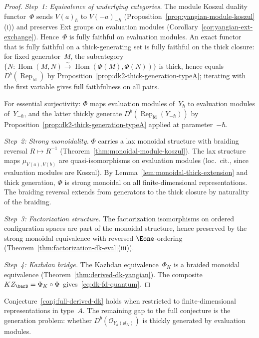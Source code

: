 \begin{proof}
\emph{Step~1: Equivalence of underlying categories.}
The module Koszul duality functor~$\Phi$ sends $V(a)_\hbar$ to
$V(-a)_{-\hbar}$ (Proposition~\ref{prop:yangian-module-koszul}(i))
and preserves Ext groups on evaluation modules
(Corollary~\ref{cor:yangian-ext-exchange}).  Hence~$\Phi$ is fully
faithful on evaluation modules.  An exact functor that is fully
faithful on a thick-generating set is fully faithful on the thick
closure: for fixed generator~$M$, the subcategory
$\{N : \operatorname{Hom}(M,N) \xrightarrow{\sim}
\operatorname{Hom}(\Phi(M), \Phi(N))\}$
is thick, hence equals $D^b(\operatorname{Rep}_{\mathrm{fd}})$ by
Proposition~\ref{prop:dk2-thick-generation-typeA}; iterating with
the first variable gives full faithfulness on all pairs.

For essential surjectivity: $\Phi$ maps evaluation modules
of~$Y_\hbar$ to evaluation modules of~$Y_{-\hbar}$, and the latter
thickly generate
$D^b(\operatorname{Rep}_{\mathrm{fd}}(Y_{-\hbar}))$ by
Proposition~\ref{prop:dk2-thick-generation-typeA} applied at
parameter~$-\hbar$.

\emph{Step~2: Strong monoidality.}
$\Phi$ carries a lax monoidal structure with braiding reversal
$R \mapsto R^{-1}$
(Theorem~\ref{thm:monoidal-module-koszul}).  The lax structure maps
$\mu_{V(a), V(b)}$ are quasi-isomorphisms on evaluation modules
(loc.~cit., since evaluation modules are Koszul).  By
Lemma~\ref{lem:monoidal-thick-extension} and thick generation,
$\Phi$ is strong monoidal on all finite-dimensional representations.
The braiding reversal extends from generators to the thick closure
by naturality of the braiding.

\emph{Step~3: Factorization structure.}
The factorization isomorphisms on ordered configuration spaces are
part of the monoidal structure, hence preserved by the strong monoidal
equivalence with reversed $\Eone$-ordering
(Theorem~\ref{thm:factorization-dk-eval}(iii)).

\emph{Step~4: Kazhdan bridge.}
The Kazhdan equivalence~$\Phi_K$ is a braided monoidal equivalence
(Theorem~\ref{thm:derived-dk-yangian}).  The composite
$KZ_{\barB} = \Phi_K \circ \Phi$ gives~\eqref{eq:dk-fd-quantum}.
\end{proof}

\begin{corollary}\label{cor:dk-partial-conj}
Conjecture~\textup{\ref{conj:full-derived-dk}} holds when restricted
to finite-dimensional representations in type~$A$.  The remaining
gap to the full conjecture is the generation problem: whether
$D^b(\mathcal{O}_{Y_\hbar(\mathfrak{sl}_N)})$ is thickly generated
by evaluation modules.
\end{corollary}

